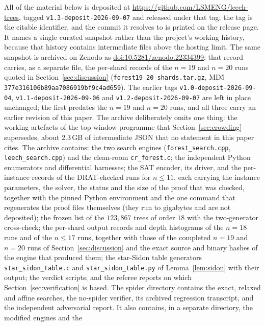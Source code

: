\documentclass[11pt,a4paper]{article}
\theoremstyle{plain}
\theoremstyle{remark}
\newcommand{\file}[1]{\texttt{#1}}
\newcommand{\bk}{\discretionary{}{}{}}
\begin{document}
All of the material below is deposited at
\url{https://github.com/LSMENG/leech-trees}, tagged
\file{v1.3-\bk deposit-\bk 2026-09-07} and released under that tag; the tag is
the citable identifier, and the commit it resolves to is printed on the release
page.  It names a single curated snapshot rather than the project's working
history, because that history contains intermediate files above the hosting
limit.  The same snapshot is archived on Zenodo as
\href{https://doi.org/10.5281/zenodo.22334399}{doi:10.5281/zenodo.22334399};
that record carries, as a separate file, the per-shard records of the $n=19$ and
$n=20$ runs quoted in Section~\ref{sec:discussion}
(\file{forest19\_\bk 20\_\bk shards.\bk tar.gz}, MD5
\texttt{377e3161\bk 06b89aa7\bk 086919bf\bk 9c4ad659}).  The earlier tags \file{v1.0-\bk deposit-\bk 2026-09-04},
\file{v1.1-\bk deposit-\bk 2026-09-06} and
\file{v1.2-\bk deposit-\bk 2026-09-07} are left in place unchanged; the first
predates the $n=19$ and $n=20$ runs, and all three carry an earlier revision of
this paper.  The archive
deliberately omits one thing: the working artefacts of the top-window programme
that Section~\ref{sec:crowding} supersedes, about $2.3$\,GB of intermediate JSON
that no statement in this paper cites.
The archive contains: the two search engines (\file{forest\_search.cpp},
\file{leech\_search.cpp}) and the clean-room \file{cr\_forest.c}; the
independent Python enumerators and differential harnesses; the SAT encoder,
its driver, and the per-instance records of the DRAT-checked runs for
$n\le 11$, each carrying the instance parameters, the solver, the status and
the size of the proof that was checked, together with the pinned Python
environment and the one command that regenerates the proof files themselves
(they run to gigabytes and are not deposited); the frozen list of the
$123{,}867$ trees
of order $18$ with the two-generator cross-check; the per-shard output records
and depth histograms of the $n=18$ runs and of the $n\le 17$ runs, together with
those of the completed $n=19$ and $n=20$ runs of Section~\ref{sec:discussion} and
the exact source and binary hashes of the engine that produced them; the
star-Sidon table generators \file{star\_\bk sidon\_\bk table.c} and
\file{star\_\bk sidon\_\bk table.py} of Lemma~\ref{lem:sidon} with their output;
the verdict scripts; and the referee reports on which Section~\ref{sec:verification} is
based.  The spider directory contains the exact, relaxed and affine searches,
the no-spider verifier, its archived regression transcript, and the independent
adversarial report.  It also contains, in a separate directory, the modified engines and the
\end{document}
